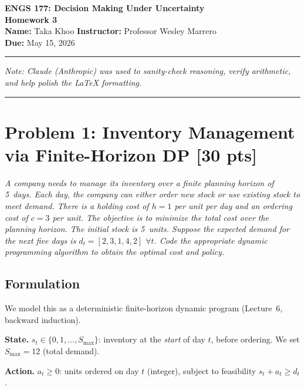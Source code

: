\documentclass[12pt]{article}
\begin{document}
\begin{center}
  {\LARGE \textbf{ENGS 177: Decision Making Under Uncertainty}}\\[0.35em]
  {\Large \textbf{Homework 3}}\\[0.25em]
  \textbf{Name:} Taka Khoo \quad\textbullet\quad \textbf{Instructor:} Professor Wesley Marrero\\[0.25em]
  \textbf{Due:} May 15, 2026
\end{center}
\hrule
\vspace{0.25em}

\footnotesize\textit{Note: Claude (Anthropic) was used to sanity-check reasoning, verify arithmetic, and help polish the \LaTeX{} formatting.}
\normalsize
\vspace{0.5em}
\hrule

\section*{Problem 1: Inventory Management via Finite-Horizon DP \hfill [30 pts]}

\textit{A company needs to manage its inventory over a finite planning horizon of 5~days. Each day, the company can either order new stock or use existing stock to meet demand. There is a holding cost of $h = 1$ per unit per day and an ordering cost of $c = 3$ per unit. The objective is to minimize the total cost over the planning horizon. The initial stock is 5~units. Suppose the expected demand for the next five days is $d_t = [2, 3, 1, 4, 2]$ $\forall t$. Code the appropriate dynamic programming algorithm to obtain the optimal cost and policy.}

\subsection*{Formulation}

We model this as a deterministic finite-horizon dynamic program (Lecture~6, backward induction).

\textbf{State.} $s_t \in \{0, 1, \ldots, S_{\max}\}$: inventory at the \emph{start} of day $t$, before ordering. We set $S_{\max} = 12$ (total demand).

\textbf{Action.} $a_t \geq 0$: units ordered on day $t$ (integer), subject to feasibility $s_t + a_t \geq d_t$.
\end{document}
